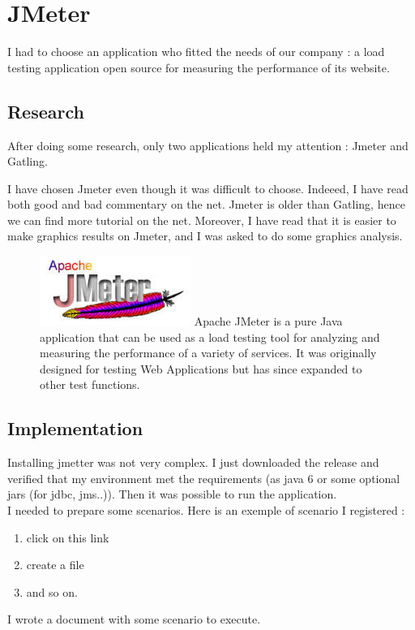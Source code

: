 

\section{JMeter}
		I had to choose an application who fitted the needs of our company : 
		a load testing application open source for measuring the performance of its website.

\subsection{Research}
After doing some research, only two applications held my attention : Jmeter and Gatling.


I have chosen Jmeter even though it was difficult to choose. 
Indeeed, I have read both good and bad commentary on the net. 
Jmeter is older than Gatling, hence we can find more tutorial on the  net. 
Moreover, I have read that it is easier to make graphics results on Jmeter, and I was asked to do some graphics analysis.

\begin{figure}[h]
		\includegraphics[scale=0.5]{Images/JMeter.jpeg} 
		Apache JMeter is a  pure Java application  that can be used as a load testing tool for analyzing
 and measuring the performance of a variety of services. It was originally designed for testing 
 Web Applications but has since expanded to other test functions. 
\end{figure}
	
\subsection{Implementation}
Installing jmetter was not very complex. I just downloaded the release and verified that my 
environment met the requirements (as java 6 or some optional jars (for jdbc, jms..)).
Then it was possible to run the application.\\

I needed to prepare some scenarios. 
Here is an exemple of scenario I registered : 
\begin{enumerate}
	\item click on this link
	\item create a file
	\item and so on.
\end{enumerate}
I wrote a document with some scenario to execute.\\

